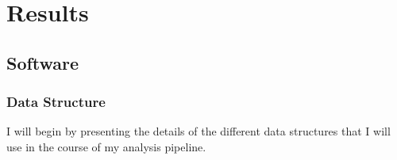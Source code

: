 \chapter{Results}

\section{Software}
\subsection{Data Structure}
I will begin by presenting the details of the different data structures that I will use in the course of my analysis pipeline.

